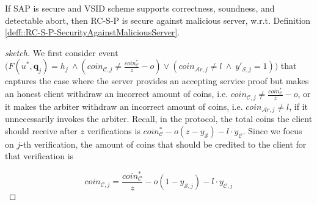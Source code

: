 
 \begin{lemma}
 If SAP is secure and  VSID scheme supports correctness, soundness, and detectable abort, then RC-S-P is secure against malicious server, w.r.t. Definition \ref{deff::RC-S-P-SecurityAgainstMaliciousServer}. 
 \end{lemma}
 

 \begin{proof}[sketch]
 We first consider event   $\Big(F(u^{\scriptscriptstyle *}, \bm{q}_{\scriptscriptstyle j})= h_{\scriptscriptstyle j}\ \wedge (coin_{\scriptscriptstyle\mathcal{C},j}\neq  \frac{coin_{\scriptscriptstyle\mathcal C}^{\scriptscriptstyle*}}{z}-o)  \vee(coin_{\scriptscriptstyle\mathcal{A}r,j}\neq l\ \wedge\  y'_{\scriptscriptstyle \mathcal {S},j}=1)\Big)$ that captures the case where the server provides an accepting service proof but makes an honest client withdraw an incorrect amount of coins, i.e. $coin_{\scriptscriptstyle\mathcal{C},j}\neq  \frac{coin_{\scriptscriptstyle\mathcal C}^{\scriptscriptstyle*}}{z}-o$, or it makes the arbiter withdraw an incorrect amount of coins, i.e. $coin_{\scriptscriptstyle\mathcal{A}r,j}\neq l$, if it unnecessarily invokes the arbiter. Recall, in the protocol, the total coins the client should receive after $z$ verifications is $coin^{\scriptscriptstyle *}_{\scriptscriptstyle\mathcal C}-o(z-y_{\scriptscriptstyle\mathcal S})-l\cdot y_{\scriptscriptstyle\mathcal C}$. Since we focus on  $j$-th verification, the amount of  coins that should be credited to the client for that verification is
 
 
% 
  
  \begin{equation}\label{equ::what-client-recives-in-j}
   coin_{\scriptscriptstyle\mathcal{C},j}=\frac{coin^{\scriptscriptstyle *}_{\scriptscriptstyle\mathcal C}}{z}-o(1-y_{\scriptscriptstyle\mathcal {S},j})-l\cdot y_{\scriptscriptstyle\mathcal {C},j}
     \end{equation}


\end{proof}
